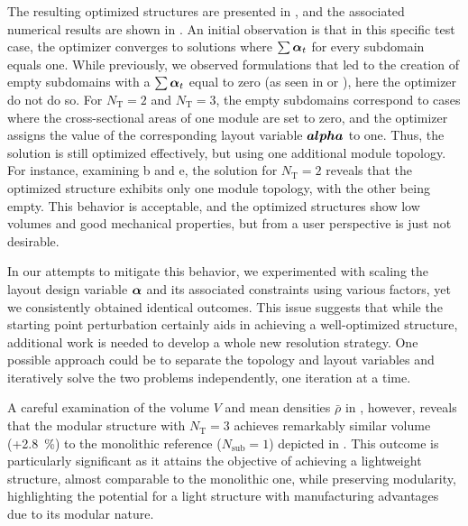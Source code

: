 The resulting optimized structures are presented in , and the associated numerical results are shown in . An initial observation is that in this specific test case, the optimizer converges to solutions where $\sum \bm{\alpha}_t$ for every subdomain equals one. While previously, we observed formulations that led to the creation of empty subdomains with a $\sum \bm{\alpha}_t$ equal to zero (as seen in  or ), here the optimizer do not do so. For $N_\text{T}=2$ and $N_\text{T}=3$, the empty subdomains correspond to cases where the cross-sectional areas of one module are set to zero, and the optimizer assigns the value of the corresponding layout variable $\bm{alpha}$ to one. Thus, the solution is still optimized effectively, but using one additional module topology. For instance, examining b and e, the solution for $N_\text{T}=2$ reveals that the optimized structure exhibits only one module topology, with the other being empty. This behavior is acceptable, and the optimized structures show low volumes and good mechanical properties, but from a user perspective is just not desirable.

In our attempts to mitigate this behavior, we experimented with scaling the layout design variable $\bm{\alpha}$ and its associated constraints using various factors, yet we consistently obtained identical outcomes. This issue suggests that while the starting point perturbation certainly aids in achieving a well-optimized structure, additional work is needed to develop a whole new resolution strategy. One possible approach could be to separate the topology and layout variables and iteratively solve the two problems independently, one iteration at a time.

A careful examination of the volume $V$ and mean densities $\bar{\rho}$ in , however, reveals that the modular structure with $N_\text{T}=3$ achieves remarkably similar volume (+\qty{2.8}{\percent}) to the monolithic reference ($N_\text{sub}=1$) depicted in . This outcome is particularly significant as it attains the objective of achieving a lightweight structure, almost comparable to the monolithic one, while preserving modularity, highlighting the potential for a light structure with manufacturing advantages due to its modular nature.

